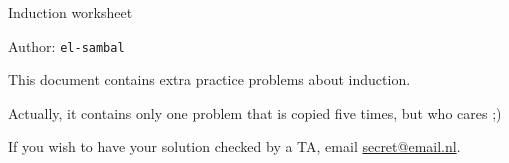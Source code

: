 \documentclass[]{exercises}
\begin{document}
\begin{center}
	{\LARGE Induction worksheet}

	\vspace{3mm}
	{\large Author: \texttt{el-sambal}}
\end{center}
\vspace{5mm}

\begin{instructions}
	This document contains extra practice problems about induction.

    \vspace{2mm}
    Actually, it contains only one problem that is copied five times, but who cares ;)

	\vspace{2mm}
	If you wish to have your solution checked by a TA, email \href{mailto:secret@email.nl}{secret@email.nl}.
\end{instructions}
\end{document}
